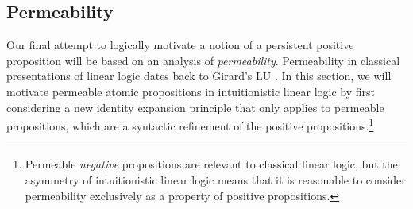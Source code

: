 

\subsection{Permeability}
\label{sec:permeable}

Our final attempt to logically motivate a notion of a persistent
positive proposition will be based on an analysis of {\it
  permeability}.  Permeability in classical presentations of linear
logic dates back to Girard's LU \cite{girard93unity}. In this section, we will motivate
permeable atomic propositions in intuitionistic linear logic by first
considering a new identity expansion principle that only applies to
permeable propositions, which are a syntactic refinement of the
positive propositions.\footnote{Permeable {\it negative} propositions
  are relevant to classical linear logic, but the asymmetry of
  intuitionistic linear logic means that it is reasonable to consider
  permeability exclusively as a property of positive propositions.}

